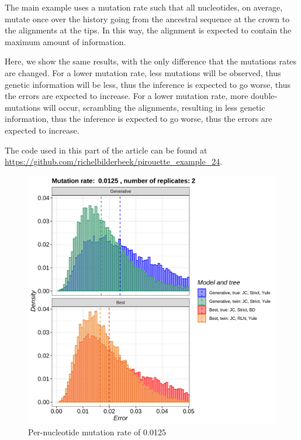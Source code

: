 The main example uses a mutation rate such that all nucleotides,
on average, mutate once over the history going from the
ancestral sequence at the crown to the alignments at the tips.
In this way, the alignment is expected to contain the maximum
amount of information.

Here, we show the same results, with the only difference that
the mutations rates are changed.
For a lower mutation rate, less mutations will be observed, thus
genetic information will be less, thus the inference is expected
to go worse, thus the errors are expected to increase.
For a lower mutation rate, more double-mutations will occur,
scrambling the alignments, resulting in less genetic information, 
thus the inference is expected to go worse, 
thus the errors are expected to increase.

The code used in this part of the article can be found at 
\url{https://github.com/richelbilderbeek/pirouette_example_24}.

\begin{figure}[H]
  \includegraphics[width=\textwidth]{pirouette_example_24/errors_1.png}
  \caption{Per-nucleotide mutation rate of 0.0125}
\end{figure}

